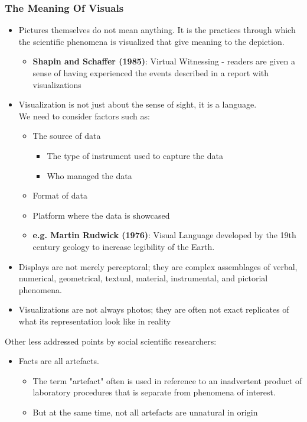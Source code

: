 \documentclass[a4paper]{article}
\begin{document}
\subsubsection{The Meaning Of Visuals}
\begin{itemize}
	\item Pictures themselves do not mean anything. It is the practices through which the scientific phenomena is visualized that give meaning to the depiction.
	\begin{itemize}[label=$\circ$]
		\item \textbf{Shapin and Schaffer (1985)}: Virtual Witnessing - readers are given a sense of having experienced the events described in a report with visualizations
	\end{itemize}
	\item Visualization is not just about the sense of sight, it is a language. \\We need to consider factors such as:
	\begin{itemize}[label=$\circ$]
		\item The source of data
		\begin{itemize}[label=\tiny$\blacksquare$]
			\item The type of instrument used to capture the data
			\item Who managed the data
		\end{itemize}
		\item Format of data
		\item Platform where the data is showcased
		\item \textbf{e.g. Martin Rudwick (1976)}: Visual Language developed by the 19th century geology to increase legibility of the Earth.
	\end{itemize}
	\item Displays are not merely perceptoral; they are complex assemblages of verbal, numerical, geometrical, textual, material, instrumental, and pictorial phenomena.
	\item Visualizations are not always photos; they are often not exact replicates of what its representation look like in reality
\end{itemize}

\noindent Other less addressed points by social scientific researchers:
\begin{itemize}
	\item Facts are all artefacts.
	\begin{itemize}[label=$\circ$]
		\item The term "artefact" often is used in reference to an inadvertent product of laboratory procedures that is separate from phenomena of interest.
		\item But at the same time, not all artefacts are unnatural in origin
	\end{itemize}
\end{itemize}
\newpage
\end{document}
